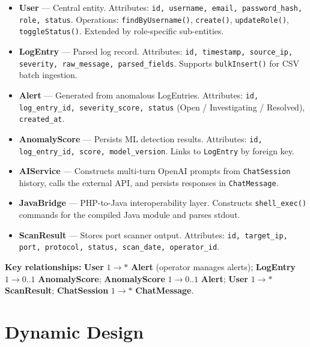 \documentclass[12pt,a4paper]{article}
\begin{document}
\begin{itemize}[leftmargin=*,itemsep=3pt]
  \item \textbf{User} --- Central entity. Attributes: \texttt{id, username, email,
    password\_hash, role, status}. Operations: \texttt{findByUsername()},
    \texttt{create()}, \texttt{updateRole()}, \texttt{toggleStatus()}.
    Extended by role-specific sub-entities.

  \item \textbf{LogEntry} --- Parsed log record. Attributes: \texttt{id, timestamp,
    source\_ip, severity, raw\_message, parsed\_fields}. Supports
    \texttt{bulkInsert()} for CSV batch ingestion.

  \item \textbf{Alert} --- Generated from anomalous LogEntries. Attributes:
    \texttt{id, log\_entry\_id, severity\_score, status}
    (Open / Investigating / Resolved), \texttt{created\_at}.

  \item \textbf{AnomalyScore} --- Persists ML detection results. Attributes:
    \texttt{id, log\_entry\_id, score, model\_version}. Links to \texttt{LogEntry}
    by foreign key.

  \item \textbf{AIService} --- Constructs multi-turn OpenAI prompts from
    \texttt{ChatSession} history, calls the external API, and persists responses
    in \texttt{ChatMessage}.

  \item \textbf{JavaBridge} --- PHP-to-Java interoperability layer. Constructs
    \texttt{shell\_exec()} commands for the compiled Java module and parses stdout.

  \item \textbf{ScanResult} --- Stores port scanner output. Attributes:
    \texttt{id, target\_ip, port, protocol, status, scan\_date, operator\_id}.
\end{itemize}

\textbf{Key relationships:}
\textbf{User} $1 \to *$ \textbf{Alert} (operator manages alerts);
\textbf{LogEntry} $1 \to 0..1$ \textbf{AnomalyScore};
\textbf{AnomalyScore} $1 \to 0..1$ \textbf{Alert};
\textbf{User} $1 \to *$ \textbf{ScanResult};
\textbf{ChatSession} $1 \to *$ \textbf{ChatMessage}.

\section{Dynamic Design}
\end{document}
